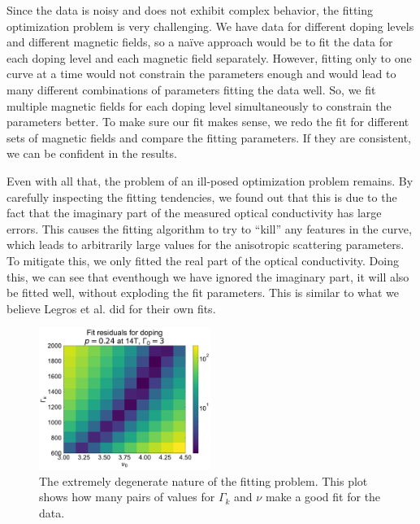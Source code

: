Since the data is noisy and does not exhibit complex behavior, the fitting optimization problem is
very challenging. We have data for different doping levels and different magnetic fields, so a
naïve approach would be to fit the data for each doping level and each magnetic field separately.
However, fitting only to one curve at a time would not constrain the parameters enough and would
lead to many different combinations of parameters fitting the data well. So, we fit multiple
magnetic fields for each doping level simultaneously to constrain the parameters better. To make
sure our fit makes sense, we redo the fit for different sets of magnetic fields and compare the
fitting parameters. If they are consistent, we can be confident in the results.

Even with all that, the problem of an ill-posed optimization problem remains. By carefully
inspecting the fitting tendencies, we found out that this is due to the fact that the imaginary
part of the measured optical conductivity has large errors. This causes the fitting algorithm to
try to ``kill'' any features in the curve, which leads to arbitrarily large values for the
anisotropic scattering parameters. To mitigate this, we only fitted the real part of the optical
conductivity. Doing this, we can see that eventhough we have ignored the imaginary part, it will
also be fitted well, without exploding the fit parameters. This is similar to what we believe
Legros et al.\cite{legros2022} did for their own fits.

\begin{figure}
    \centering
    \includegraphics[width=0.5\textwidth]{figures/residuals_degenerate}
    \caption{The extremely degenerate nature of the fitting problem. This plot shows how many pairs
        of values for $\Gamma_k$ and $\nu$ make a good fit for the data.}
    \label{fig:residuals_degenerate}
\end{figure}
